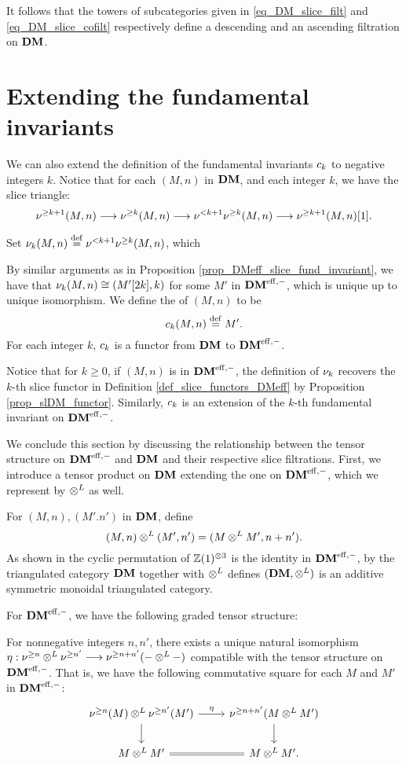 It follows that the towers of subcategories given in 
\eqref{eq_DM_slice_filt} and \eqref{eq_DM_slice_cofilt} 
respectively define a descending and an ascending filtration on 
$\mathbf{DM}$.

\section{Extending the fundamental invariants}

We can also extend the definition of the fundamental invariants
$c_{k}$ to negative integers $k$. Notice that for each $(M, n)$
in $\mathbf{DM}$, and each integer $k$, we have the slice triangle:
\[
\nu^{\geq k + 1}(M, n) \longrightarrow \nu^{\geq k}(M, n) \longrightarrow \nu^{< k + 1}\nu^{\geq k}(M, n)
\longrightarrow \nu^{\geq k + 1}(M, n)[1].
\]

\begin{defn}
Set $\nu_{k}(M, n) \stackrel{\mathrm{def}}{=} \nu^{< k + 1}\nu^{\geq k}(M, n)$, which

By similar arguments as in Proposition 
\ref{prop_DMeff_slice_fund_invariant}, we have that 
$\nu_{k}(M, n) \cong (M'[2k], k)$ for some $M'$ in $\mathbf{DM}^{\mathrm{eff},-}$,
which is unique up to unique isomorphism. We 
define the  of $(M, n)$ to be
\[
c_{k}(M, n) \stackrel{\mathrm{def}}{=} M'.
\]
For each integer $k$, $c_{k}$ is a functor from $\mathbf{DM}$ to
$\mathbf{DM}^{\mathrm{eff},-}$.

Notice that for $k \geq 0$, if $(M, n)$ is in $\mathbf{DM}^{\mathrm{eff},-}$, the definition
of $\nu_{k}$ recovers the $k$-th slice functor in Definition
\ref{def_slice_functors_DMeff} by Proposition
\ref{prop_slDM_functor}. Similarly, $c_{k}$ is an extension of the
$k$-th fundamental invariant on $\mathbf{DM}^{\mathrm{eff},-}$.
\end{defn}

We conclude this section by discussing the relationship between the
tensor structure on $\mathbf{DM}^{\mathrm{eff},-}$ and $\mathbf{DM}$ and their respective slice
filtrations. First, we introduce a tensor product on $\mathbf{DM}$ extending
the one on $\mathbf{DM}^{\mathrm{eff},-}$, which we represent by $\otimes^L$ as well.

For $(M, n), (M'. n')$ in $\mathbf{DM}$, define 
\[
(M, n) \otimes^L (M', n') = (M \otimes^L M', n + n'). 
\]
As shown in \cite[15.8]{MVW} the cyclic permutation of 
$\mathbb{Z}(1)^{\otimes 3}$ is the identity in $\mathbf{DM}^{\mathrm{eff},-}$, by 
\cite[8.4A12]{MVW} the triangulated category $\mathbf{DM}$ together with 
$\otimes^L$ defines $(\mathbf{DM}, \otimes^L)$ is an additive symmetric monoidal 
triangulated category.

For $\mathbf{DM}^{\mathrm{eff},-}$, we have the following graded tensor structure:

\begin{prop}\label{prop_tDM_sfilt_DMeff}
For nonnegative integers $n, n'$, there exists a unique natural
isomorphism $\eta: \nu^{\geq n} \otimes^L \nu^{\geq n'} \longrightarrow \nu^{\geq n + n'}(- 
\otimes^L -)$ compatible with the tensor structure on $\mathbf{DM}^{\mathrm{eff},-}$. That 
is, we have the following commutative square for each $M$ and
$M'$ in $\mathbf{DM}^{\mathrm{eff},-}$:
\[
\begin{tikzcd}
\sgDM{n}(M) \tDM \sgDM{n'}(M') \arrow{r}{\eta} \arrow{d} &
\sgDM{n + n'}(M \tDM M') \arrow{d} \\
M \tDM M' \arrow[equals]{r} &
M \tDM M'.
\end{tikzcd}
\]
\end{prop}

